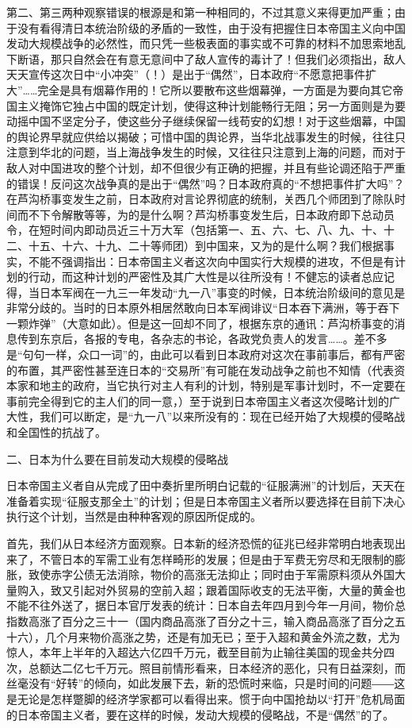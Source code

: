 第二、第三两种观察错误的根源是和第一种相同的，不过其意义来得更加严重；由于没有看得清日本统治阶级的矛盾的一致性，由于没有把握住日本帝国主义向中国发动大规模战争的必然性，而只凭一些极表面的事实或不可靠的材料不加思索地乱下断语，那只自然会在有意无意间中了敌人宣传的毒计了！但我们必须指出，敌人天天宣传这次日中“小冲突”（！）是出于“偶然”，日本政府“不愿意把事件扩大”……完全是具有烟幕作用的！它所以要散布这些烟幕弹，一方面是为要向其它帝国主义掩饰它独占中国的既定计划，使得这种计划能畅行无阻；另一方面则是为要动摇中国不坚定分子，使这些分子继续保留一线苟安的幻想！对于这些烟幕，中国的舆论界早就应供给以揭破；可惜中国的舆论界，当华北战事发生的时候，往往只注意到华北的问题，当上海战争发生的时候，又往往只注意到上海的问题，而对于敌人对中国进攻的整个计划，却不但很少有正确的把握，并且有些论调还陷于严重的错误！反问这次战争真的是出于“偶然”吗？日本政府真的“不想把事件扩大吗”？在芦沟桥事变发生之前，日本政府对言论界彻底的统制，关西几个师团到了除队时间而不下令解散等等，为的是什么啊？芦沟桥事变发生后，日本政府即下总动员令，在短时间内即动员近三十万大军（包括第一、五、六、七、八、九、十、十二、十五、十六、十九、二十等师团）到中国来，又为的是什么啊？我们根据事实，不能不强调指出：日本帝国主义者这次向中国实行大规模的进攻，不但是有计划的行动，而这种计划的严密性及其广大性是以往所没有！不健忘的读者总应记得，当日本军阀在一九三一年发动“九一八”事变的时候，日本统治阶级间的意见是非常分歧的。当时的日本原外相居然敢向日本军阀诽议“日本吞下满洲，等于吞下一颗炸弹”（大意如此）。但是这一回却不同了，根据东京的通讯：芦沟桥事变的消息传到东京后，各报的专电，各杂志的书论，各政党负责人的发言……。差不多是“句句一样，众口一词”的，由此可以看到日本政府对这次在事前事后，都有严密的布置，其严密性甚至连日本的“交易所”有可能在发动战争之前也不知情（代表资本家和地主的政府，当它执行对主人有利的计划，特别是军事计划时，不一定要在事前完全得到它的主人们的同一意，）至于说到日本帝国主义者这次侵略计划的广大性，我们可以断定，是“九一八”以来所没有的：现在已经开始了大规模的侵略战和全国性的抗战了。

二、日本为什么要在目前发动大规模的侵略战

日本帝国主义者自从完成了田中奏折里所明白记载的“征服满洲”的计划后，天天在准备着实现“征服支那全土”的计划；但是日本帝国主义者所以要选择在目前下决心执行这个计划，当然是由种种客观的原因所促成的。

首先，我们从日本经济方面观察。日本新的经济恐慌的征兆已经非常明白地表现出来了，不管日本的军需工业有怎样畸形的发展；但是由于军费无穷尽和无限制的膨胀，致使赤字公债无法消除，物价的高涨无法抑止；同时由于军需原料须从外国大量购入，致又引起对外贸易的空前入超；跟着国际收支的无法平衡，大量的黄金也不能不往外送了，据日本官厅发表的统计：日本自去年四月到今年一月间，物价总指数高涨了百分之三十一（国内商品高涨了百分之十三，输入商品高涨了百分之五十六），几个月来物价高涨之势，还是有加无已；至于入超和黄金外流之数，尤为惊人，本年上半年的入超达六亿四千万元，截至目前为止输往美国的现金共分四次，总额达二亿七千万元。照目前情形看来，日本经济的恶化，只有日益深刻，而丝毫没有“好转”的倾向，如此发展下去，新的恐慌时来临，只是时间的问题――这是无论是怎样蹩脚的经济学家都可以看得出来。惯于向中国抢劫以“打开”危机局面的日本帝国主义者，要在这样的时候，发动大规模的侵略战，不是“偶然”的了。

